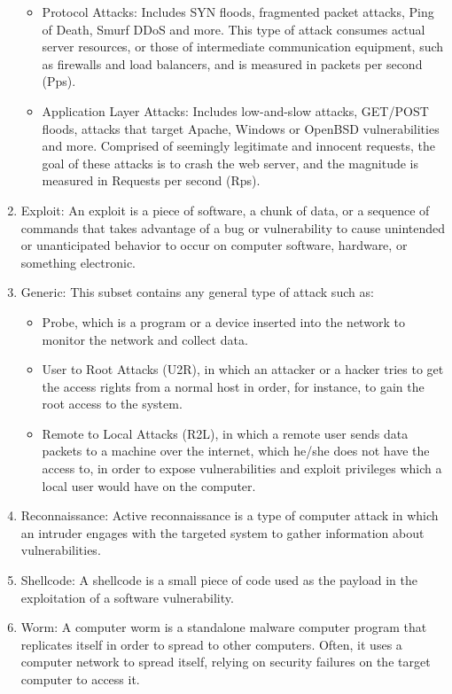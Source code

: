 \begin{enumerate}
\begin{itemize}
        \item Protocol Attacks: Includes SYN floods, fragmented packet attacks, Ping of Death, Smurf DDoS and more. This type of attack consumes actual server resources, or those of intermediate communication equipment, such as firewalls and load balancers, and is measured in packets per second (Pps).
        \item Application Layer Attacks: Includes low-and-slow attacks, GET/POST floods, attacks that target Apache, Windows or OpenBSD vulnerabilities and more. Comprised of seemingly legitimate and innocent requests, the goal of these attacks is to crash the web server, and the magnitude is measured in Requests per second (Rps).
    \end{itemize}
    \item Exploit: An exploit is a piece of software, a chunk of data, or a sequence of commands that takes advantage of a bug or vulnerability to cause unintended or unanticipated behavior to occur on computer software, hardware, or something electronic.
    \item Generic: This subset contains any general type of attack such as:
    \begin{itemize}
        \item Probe, which is a program or a device inserted into the network to monitor the network and collect data.
        \item User to Root Attacks (U2R), in which an attacker or a hacker tries to get the access rights from a normal host in order, for instance, to gain the root access to the system.
        \item Remote to Local Attacks (R2L), in which a remote user sends data packets to a machine over the internet, which he/she does not have the access to, in order to expose vulnerabilities and exploit privileges which a local user would have on the computer.
    \end{itemize}
    \item Reconnaissance: Active reconnaissance is a type of computer attack in which an intruder engages with the targeted system to gather information about vulnerabilities.
    \item Shellcode: A shellcode is a small piece of code used as the payload in the exploitation of a software vulnerability.
    \item Worm: A computer worm is a standalone malware computer program that replicates itself in order to spread to other computers. Often, it uses a computer network to spread itself, relying on security failures on the target computer to access it.
\end{enumerate}
